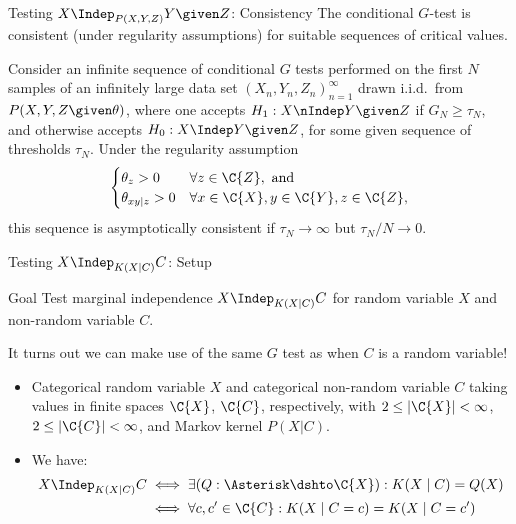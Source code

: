 \begin{frame}{Testing $X \Indep_{P(X,Y,Z)} Y \given Z$: Consistency}
  The conditional $G$-test is consistent (under regularity assumptions) for suitable sequences of critical values.
  \begin{Cor}
  Consider an infinite sequence of conditional $G$ tests performed on the first $N$ samples of an infinitely large
  data set $(X_n,Y_n,Z_n)_{n=1}^\infty$ drawn i.i.d.\ from $P(X,Y,Z \given \theta)$,
  where one accepts $H_1 : X \nIndep Y \given Z$ if $G_N \ge \tau_N$, and otherwise accepts $H_0 : X \Indep Y \given Z$,
  for some given sequence of thresholds $\tau_N$.
  Under the regularity assumption 
\begin{equation*}
  \begin{cases}
    \theta_z > 0 & \forall z \in \C{Z}, \text{ and}\\
    \theta_{xy|z} > 0 & \forall x \in \C{X}, y\in \C{Y}, z\in \C{Z},
  \end{cases}
\end{equation*}
  this sequence is asymptotically consistent if $\tau_N \to \infty$ but $\tau_N / N \to 0$.
  \end{Cor}
\end{frame}


\begin{frame}{Testing $X \Indep_{K(X|C)} C$: Setup}
  \begin{block}{Goal}
    Test marginal independence $X \Indep_{K(X|C)} C$ for random variable $X$ and non-random variable $C$.
  \end{block}

  \bigskip
  It turns out we can make use of the same $G$ test as when $C$ is a random variable!

  \bigskip
  \begin{itemize}
    \item Categorical random variable $X$ and categorical non-random variable $C$ taking values in finite spaces $\C{X}$, $\C{C}$,
respectively, with $2 \le |\C{X}| < \infty$, $2 \le |\C{C}| < \infty$, and Markov kernel $P(X|C)$.
    \item We have:
      \begin{equation*}\begin{split}
        X \Indep_{K(X|C)} C
        & \iff \exists (Q : \Asterisk \dshto \C{X}) : K(X\mid C) = Q(X) \\
        & \iff \forall c,c' \in \C{C}: K(X\mid C=c) = K(X\mid C=c') 
      \end{split}\end{equation*}
  \end{itemize}
\end{frame}


